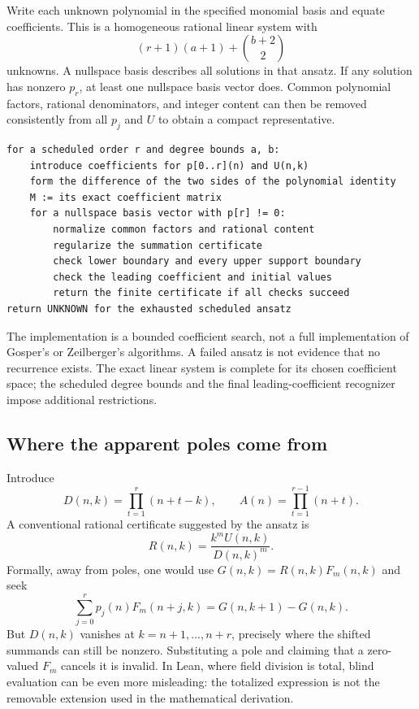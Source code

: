 Write each unknown polynomial in the specified monomial basis and equate
coefficients. This is a homogeneous rational linear system with
\[
 (r+1)(a+1)+\binom{b+2}{2}
\]
unknowns. A nullspace basis describes all solutions in that ansatz. If any
solution has nonzero $p_r$, at least one nullspace basis vector does. Common
polynomial factors, rational denominators, and integer content can then be
removed consistently from all $p_j$ and $U$ to obtain a compact representative.

\par\noindent\begin{minipage}{\linewidth}
\begin{lstlisting}
for a scheduled order r and degree bounds a, b:
    introduce coefficients for p[0..r](n) and U(n,k)
    form the difference of the two sides of the polynomial identity
    M := its exact coefficient matrix
    for a nullspace basis vector with p[r] != 0:
        normalize common factors and rational content
        regularize the summation certificate
        check lower boundary and every upper support boundary
        check the leading coefficient and initial values
        return the finite certificate if all checks succeed
return UNKNOWN for the exhausted scheduled ansatz
\end{lstlisting}
\end{minipage}\par

The implementation is a bounded coefficient search, not a full implementation
of Gosper's or Zeilberger's algorithms. A failed ansatz is not evidence that no
recurrence exists. The exact linear system is complete for its chosen
coefficient space; the scheduled degree bounds and the final leading-coefficient
recognizer impose additional restrictions.

\subsection{Where the apparent poles come from}

Introduce
\[
 D(n,k)=\prod_{t=1}^{r}(n+t-k),\qquad
 A(n)=\prod_{t=1}^{r-1}(n+t).
\]
A conventional rational certificate suggested by the ansatz is
\[
 R(n,k)=\frac{k^mU(n,k)}{D(n,k)^m}.
\]
Formally, away from poles, one would use
$G(n,k)=R(n,k)F_m(n,k)$ and seek
\[
 \sum_{j=0}^{r}p_j(n)F_m(n+j,k)=G(n,k+1)-G(n,k).
\]
But $D(n,k)$ vanishes at $k=n+1,\ldots,n+r$, precisely where the shifted
summands can still be nonzero. Substituting a pole and claiming that a
zero-valued $F_m$ cancels it is invalid. In Lean, where field division is total,
blind evaluation can be even more misleading: the totalized expression is not
the removable extension used in the mathematical derivation.

